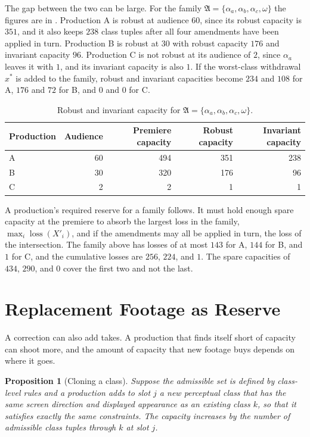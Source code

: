 \documentclass[11pt,twoside,openright]{book}
\theoremstyle{plain}
\newtheorem{proposition}[theorem]{Proposition}
\theoremstyle{definition}
\theoremstyle{remark}
\DeclareMathOperator{\loss}{loss}
\begin{document}
The gap between the two can be large. For the family $\mathfrak A=\{\alpha_a,\alpha_b,\alpha_c,\omega\}$ the figures are in . Production A is robust at audience $60$, since its robust capacity is $351$, and it also keeps $238$ class tuples after all four amendments have been applied in turn. Production B is robust at $30$ with robust capacity $176$ and invariant capacity $96$. Production C is not robust at its audience of $2$, since $\alpha_a$ leaves it with $1$, and its invariant capacity is also $1$. If the worst-class withdrawal $x^\ast$ is added to the family, robust and invariant capacities become $234$ and $108$ for A, $176$ and $72$ for B, and $0$ and $0$ for C.

\begin{table}[ht]
\centering
\begin{tabular}{@{}lrrrr@{}}
\toprule
Production & Audience & Premiere capacity & Robust capacity & Invariant capacity\\
\midrule
A & 60 & 494 & 351 & 238\\
B & 30 & 320 & 176 & 96\\
C & 2 & 2 & 1 & 1\\
\bottomrule
\end{tabular}
\caption{Robust and invariant capacity for $\mathfrak A=\{\alpha_a,\alpha_b,\alpha_c,\omega\}$.}\label{tab:robust}
\end{table}

A production's required reserve for a family follows. It must hold enough spare capacity at the premiere to absorb the largest loss in the family, $\max_i\loss(X'_i)$, and if the amendments may all be applied in turn, the loss of the intersection. The family above has losses of at most $143$ for A, $144$ for B, and $1$ for C, and the cumulative losses are $256$, $224$, and $1$. The spare capacities of $434$, $290$, and $0$ cover the first two and not the last.

\section{Replacement Footage as Reserve}\label{sec:reserve}

A correction can also add takes. A production that finds itself short of capacity can shoot more, and the amount of capacity that new footage buys depends on where it goes.

\begin{proposition}[Cloning a class]\label{prop:clone}
Suppose the admissible set is defined by class-level rules and a production adds to slot $j$ a new perceptual class that has the same screen direction and displayed appearance as an existing class $k$, so that it satisfies exactly the same constraints. The capacity increases by the number of admissible class tuples through $k$ at slot $j$.
\end{proposition}
\end{document}
